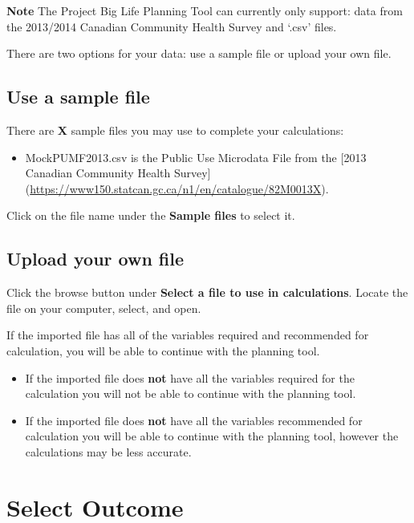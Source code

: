 \documentclass[]{book}
\providecommand{\tightlist}{%
  \setlength{\itemsep}{0pt}\setlength{\parskip}{0pt}}
\begin{document}
\textbf{Note} The Project Big Life Planning Tool can currently only
support: data from the 2013/2014 Canadian Community Health Survey and
`.csv' files.

There are two options for your data: use a sample file or upload your
own file.

\subsection{Use a sample file}\label{use-a-sample-file}

There are \textbf{X} sample files you may use to complete your
calculations:

\begin{itemize}
\tightlist
\item
  MockPUMF2013.csv is the Public Use Microdata File from the {[}2013
  Canadian Community Health Survey{]}
  (\url{https://www150.statcan.gc.ca/n1/en/catalogue/82M0013X}).
\end{itemize}

Click on the file name under the \textbf{Sample files} to select it.

\subsection{Upload your own file}\label{upload-your-own-file}

Click the browse button under \textbf{Select a file to use in
calculations}. Locate the file on your computer, select, and open.

If the imported file has all of the variables required and recommended
for calculation, you will be able to continue with the planning tool.

\begin{itemize}
\item
  If the imported file does \textbf{not} have all the variables required
  for the calculation you will not be able to continue with the planning
  tool.
\item
  If the imported file does \textbf{not} have all the variables
  recommended for calculation you will be able to continue with the
  planning tool, however the calculations may be less accurate.
\end{itemize}

\section{Select Outcome}\label{select-outcome}
\end{document}
